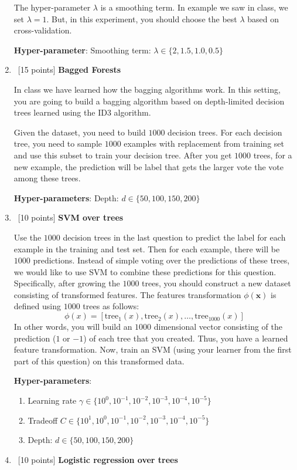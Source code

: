 \begin{enumerate}
  The hyper-parameter $\lambda$ is a smoothing term. In example we saw
  in class, we set $\lambda= 1$.  But, in this experiment, you should
  choose the best $\lambda$ based on cross-validation.

  \textbf{Hyper-parameter}: Smoothing term: $\lambda \in \{2, 1.5, 1.0, 0.5\}$

\item~[15 points] \textbf{Bagged Forests}

  In class we have learned how the bagging algorithms work.
  In this setting, you are going to build a bagging algorithm based on
  depth-limited decision trees learned using the ID3 algorithm.

  Given the dataset, you need to build $1000$ decision trees. For each
  decision tree, you need to sample $1000$ examples with replacement
  from training set and use this subset to train your decision tree.
  After you get $1000$ trees, for a new example, the prediction will
  be label that gets the larger vote the vote among these trees.

  \textbf{Hyper-parameters}: Depth: $d \in \{50, 100, 150, 200\}$

\item~[10 points] \textbf{SVM over trees}

  Use the $1000$ decision trees in the last question to predict the label for each example in the training and test set.
  Then for each example, there will be $1000$ predictions.
  Instead of simple voting over the predictions of these trees, we would like to use SVM to combine these predictions for this question.
  Specifically, after growing the $1000$ trees, you should construct a new dataset consisting of transformed features.
  The features transformation $\phi(\mathbf{x})$ is defined using $1000$ trees as follows:
  \begin{equation*}
    \phi(x) = [\text{tree}_1(x),\text{tree}_2(x),\ldots, \text{tree}_{1000}(x)]
  \end{equation*}
  In other words, you will build an $1000$ dimensional vector consisting of the prediction ($1$ or $-1$) of each tree that you created.
  Thus, you have a learned feature transformation. Now, train an SVM
  (using your learner from the first part of this question) on this
  transformed data.

  \textbf{Hyper-parameters}:
  \begin{enumerate}
  \item Learning rate $\gamma\in\{10^0, 10^{-1}, 10^{-2}, 10^{-3}, 10^{-4}, 10^{-5}\}$
  \item Tradeoff $C \in \{10^1, 10^0, 10^{-1}, 10^{-2}, 10^{-3}, 10^{-4}, 10^{-5}\}$
  \item Depth: $d \in \{50, 100, 150, 200\}$
  \end{enumerate}
\item~[10 points] \textbf{Logistic regression over trees}


\end{enumerate}
